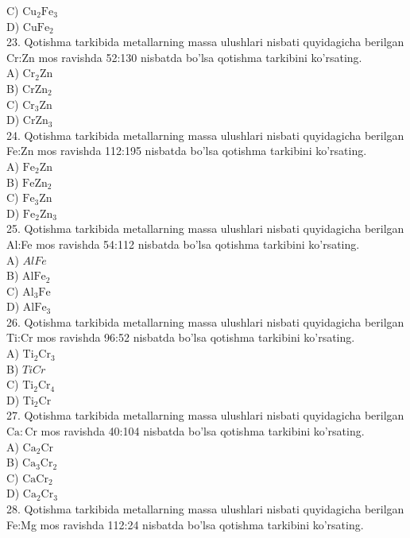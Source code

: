 C) $\mathrm{Cu}_{2} \mathrm{Fe}_{3}$\\
D) $\mathrm{CuFe}_{2}$\\
23. Qotishma tarkibida metallarning massa ulushlari nisbati quyidagicha berilgan Cr:Zn mos ravishda 52:130 nisbatda bo'lsa qotishma tarkibini ko'rsating.\\
A) $\mathrm{Cr}_{2} \mathrm{Zn}$\\
B) $\mathrm{CrZn}_{2}$\\
C) $\mathrm{Cr}_{3} \mathrm{Zn}$\\
D) $\mathrm{CrZn}_{3}$\\
24. Qotishma tarkibida metallarning massa ulushlari nisbati quyidagicha berilgan Fe:Zn mos ravishda 112:195 nisbatda bo'lsa qotishma tarkibini ko'rsating.\\
A) $\mathrm{Fe}_{2} \mathrm{Zn}$\\
B) $\mathrm{FeZn}_{2}$\\
C) $\mathrm{Fe}_{3} \mathrm{Zn}$\\
D) $\mathrm{Fe}_{2} \mathrm{Zn}_{3}$\\
25. Qotishma tarkibida metallarning massa ulushlari nisbati quyidagicha berilgan Al:Fe mos ravishda 54:112 nisbatda bo'lsa qotishma tarkibini ko'rsating.\\
A) $AlFe$\\
B) $\mathrm{AlFe}_{2}$\\
C) $\mathrm{Al}_{3} \mathrm{Fe}$\\
D) $\mathrm{AlFe}_{3}$\\
26. Qotishma tarkibida metallarning massa ulushlari nisbati quyidagicha berilgan Ti:Cr mos ravishda 96:52 nisbatda bo'lsa qotishma tarkibini ko'rsating.\\
A) $\mathrm{Ti}_{2} \mathrm{Cr}_{3}$\\
B) $TiCr$\\
C) $\mathrm{Ti}_{2} \mathrm{Cr}_{4}$\\
D) $\mathrm{Ti}_{2} \mathrm{Cr}$\\
27. Qotishma tarkibida metallarning massa ulushlari nisbati quyidagicha berilgan $\mathrm{Ca}: \mathrm{Cr}$ mos ravishda 40:104 nisbatda bo'lsa qotishma tarkibini ko'rsating.\\
A) $\mathrm{Ca}_{2} \mathrm{Cr}$\\
B) $\mathrm{Ca}_{3} \mathrm{Cr}_{2}$\\
C) $\mathrm{CaCr}_{2}$\\
D) $\mathrm{Ca}_{2} \mathrm{Cr}_{3}$\\
28. Qotishma tarkibida metallarning massa ulushlari nisbati quyidagicha berilgan Fe:Mg mos ravishda 112:24 nisbatda bo'lsa qotishma tarkibini ko'rsating.\\
